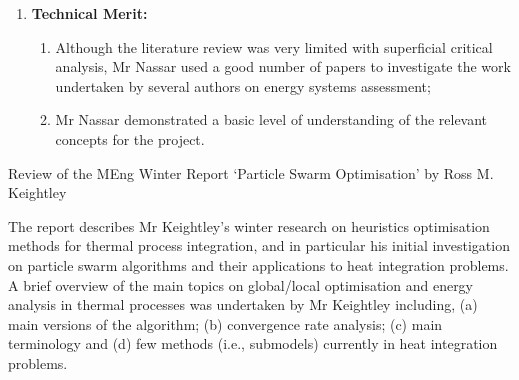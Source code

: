 \documentclass[14pt,twoside]{report}
\begin{document}
\begin{enumerate}
\begin{enumerate}
                     The literature review undertaken in this report was very limited and lacked a coherent structure, and covered very few topics on methodologies currently used by academics (and industry) to assess effectiveness and efficiency of power systems.
                   \item The report does not state aims and objectives of either the project or the report.
                   \item Work plan (Gantt chart) lacks rigour on specific activities that will be undertaken by the student, and milestones designed to achieve the project's aims.
                   \item There is no conclusion section in the report.
                \end{enumerate}
%
    \item {\bf Technical Merit:}
                \begin{enumerate}
                   \item Although the literature review was very limited with superficial critical analysis, Mr Nassar used a good number of papers to investigate the work undertaken by several authors on energy systems assessment;
                   \item  Mr Nassar demonstrated a basic level of understanding of the relevant concepts for the project. 
                \end{enumerate}
%
\end{enumerate}

\medskip

\clearpage




\bigskip

\begin{center}
  {\Large Review of the MEng Winter Report `Particle Swarm Optimisation' by Ross M. Keightley}
\end{center}

The report describes Mr Keightley's winter research on heuristics optimisation methods for thermal process integration, and in particular his initial investigation on particle swarm algorithms and their applications to heat integration problems. A brief overview of the main topics on global/local optimisation and energy analysis in thermal processes was undertaken by Mr Keightley including, (a) main versions of the algorithm; (b) convergence rate analysis; (c) main terminology and (d) few methods (i.e., submodels) currently in heat integration problems.  
\end{document}
